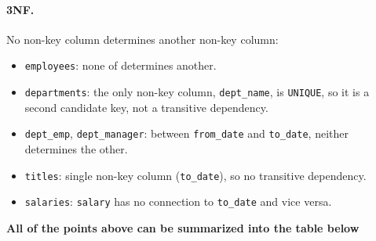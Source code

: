 \documentclass{assignment}
\begin{document}
\paragraph{3NF.} No non-key column determines another non-key column:
\begin{itemize}[noitemsep]
    \item \texttt{employees}: none of determines another.
    \item \texttt{departments}: the only non-key column,
        \texttt{dept\_name}, is \texttt{UNIQUE}, so it is a second
        candidate key, not a transitive dependency.
    \item \texttt{dept\_emp}, \texttt{dept\_manager}: between
        \texttt{from\_date} and \texttt{to\_date}, neither determines
        the other.
    \item \texttt{titles}: single non-key column
        (\texttt{to\_date}), so no transitive dependency.
    \item \texttt{salaries}: \texttt{salary} has no connection to
        \texttt{to\_date} and vice versa.
\end{itemize}

\noindent \textbf{All of the points above can be summarized into the
table below}
\end{document}
